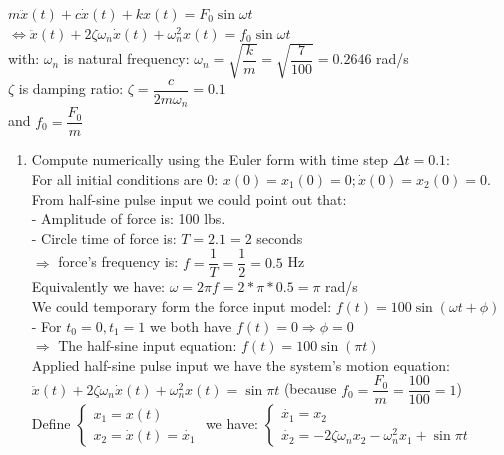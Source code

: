 \documentclass[14pt,a4paper]{article}
\begin{document}
\hspace*{3cm} $m\ddot{x}(t) + c\dot{x}(t) + kx(t) = F_0\sin\omega t$ \\
\hspace*{2.6cm} $ \Leftrightarrow \ddot{x}(t) + 2 \zeta \omega_n \dot{x}(t) + \omega_n^2x(t) = f_0\sin \omega t$\\
with: $\omega_n$ is natural frequency: $\omega_n = \sqrt{\dfrac{k}{m}} = \sqrt{\dfrac{7}{100}} = 0.2646$ rad/s\\
	\hspace*{1cm}	$\zeta$ is damping ratio: $\zeta = \dfrac{c}{2m\omega_n} = 0.1$\\
 \hspace*{1cm} and $f_0 = \dfrac{F_0}{m}$

\begin{enumerate}
	\label{Problem 1}
	\item Compute numerically using the Euler form with time step $\Delta t = 0.1$:\\
	For all initial conditions are 0: $x(0) = x_1(0) = 0; \dot{x}(0) = x_2(0) = 0$.\\
	From half-sine pulse input we could point out that:\\
	\hspace*{1cm} - Amplitude of force is: 100 lbs.\\
	\hspace*{1cm} - Circle time of force is: $T = 2.1 = 2$ seconds\\
	\hspace*{1cm} $\Rightarrow$ force's frequency is: $ f = \dfrac{1}{T} = \dfrac{1}{2} = 0.5$ Hz \\
	\hspace*{0.5cm} Equivalently we have: $\omega = 2\pi f = 2*\pi*0.5 = \pi$ rad/s\\
	\hspace*{0.5cm} We could temporary form the force input model: $f(t) = 100\sin(\omega t + \phi)$\\
	\hspace*{1cm} - For $t_0 = 0, t_1 = 1$ we both have $f(t) = 0 \Rightarrow \phi = 0$\\
	\hspace*{1cm} $\Rightarrow$ The half-sine input equation: $ f(t) = 100\sin(\pi t)$\\
	Applied half-sine pulse input we have the system's motion equation:\\
	\hspace*{2.6cm} $ \ddot{x}(t) + 2 \zeta \omega_n \dot{x}(t) + \omega_n^2x(t) = \sin \pi t$ \hspace{1cm} (because $f_0 = \dfrac{F_0}{m} = \dfrac{100}{100} =1$)\\
	Define $ \begin{cases} x_1 = x(t) \\ x_2 = \dot{x}(t) = \dot{x_1} \end{cases} $ we have: $\begin{cases} \dot{x_1} = x_2 \\ \dot{x_2} = - 2\zeta\omega_nx_2 - \omega_n^2x_1 + \sin\pi t \end{cases} $\\
	

\end{enumerate}
\end{document}
